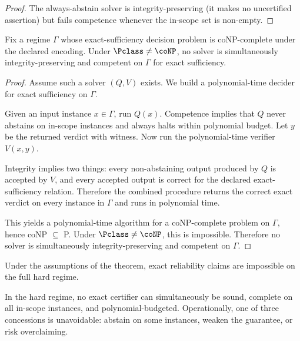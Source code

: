 \begin{proof}
The always-abstain solver is integrity-preserving (it makes no uncertified assertion) but fails competence whenever the in-scope set is non-empty.
\end{proof}

\begin{theorem}\label{thm:integrity-resource}
Fix a regime $\Gamma$ whose exact-sufficiency decision problem is coNP-complete under the declared encoding. Under $\Pclass\neq\coNP$, no solver is simultaneously integrity-preserving and competent on $\Gamma$ for exact sufficiency.
\end{theorem}


\begin{proof}
Assume such a solver $(Q,V)$ exists. We build a polynomial-time decider for exact sufficiency on $\Gamma$.

Given an input instance $x\in \Gamma$, run $Q(x)$. Competence implies that $Q$ never abstains on in-scope instances and always halts within polynomial budget. Let $y$ be the returned verdict with witness. Now run the polynomial-time verifier $V(x,y)$.

Integrity implies two things: every non-abstaining output produced by $Q$ is accepted by $V$, and every accepted output is correct for the declared exact-sufficiency relation. Therefore the combined procedure returns the correct exact verdict on every instance in $\Gamma$ and runs in polynomial time.

This yields a polynomial-time algorithm for a coNP-complete problem on $\Gamma$, hence coNP $\subseteq$ P. Under $\Pclass\neq\coNP$, this is impossible. Therefore no solver is simultaneously integrity-preserving and competent on $\Gamma$.
\end{proof}

\begin{corollary}
Under the assumptions of the theorem, exact reliability claims are impossible on the full hard regime.
\end{corollary}


\begin{corollary}
In the hard regime, no exact certifier can simultaneously be sound, complete on all in-scope instances, and polynomial-budgeted. Operationally, one of three concessions is unavoidable: abstain on some instances, weaken the guarantee, or risk overclaiming.
\end{corollary}

